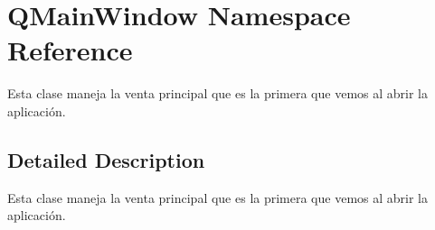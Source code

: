 \hypertarget{namespace_q_main_window}{}\section{Q\+Main\+Window Namespace Reference}
\label{namespace_q_main_window}


Esta clase maneja la venta principal que es la primera que vemos al abrir la aplicación.  




\subsection{Detailed Description}
Esta clase maneja la venta principal que es la primera que vemos al abrir la aplicación. 